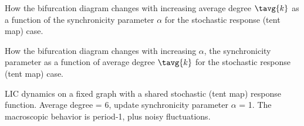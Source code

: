 



\begin{frame}
  \begin{block}{}
    \small 
    How the bifurcation diagram changes with increasing average degree
    $\tavg{k}$
    as a function of the synchronicity parameter $\alpha$
    for the stochastic response (tent map) case.
  \end{block}
\end{frame}

\begin{frame}
  \begin{block}{}
    \small
    How the bifurcation diagram changes with increasing $\alpha$, the
    synchronicity parameter as a function of average degree $\tavg{k}$
    for the stochastic response (tent map) case.
  \end{block}
\end{frame}

\begin{frame}
  \begin{block}{}
    \small
    LIC dynamics on a fixed graph with a
    shared stochastic (tent map) response function. Average degree =
    6, update synchronicity parameter $\alpha$ = 1. The macroscopic
    behavior is period-1, plus noisy fluctuations.
  \end{block}
\end{frame}

